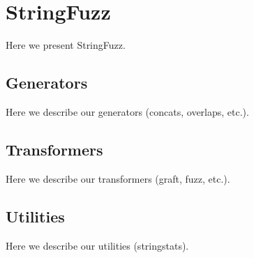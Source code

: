 \section{StringFuzz}

    Here we present StringFuzz.

    \subsection{Generators}

        Here we describe our generators (concats, overlaps, etc.).

    \subsection{Transformers}

        Here we describe our transformers (graft, fuzz, etc.).

    \subsection{Utilities}

        Here we describe our utilities (stringstats).
